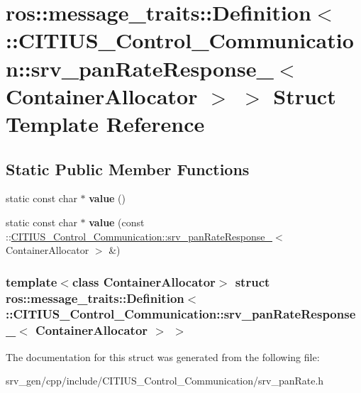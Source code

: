 \hypertarget{structros_1_1message__traits_1_1_definition_3_01_1_1_c_i_t_i_u_s___control___communication_1_1sre52d93f29599aaca44d221f01e8df1fa}{\section{ros\-:\-:message\-\_\-traits\-:\-:\-Definition$<$ \-:\-:\-C\-I\-T\-I\-U\-S\-\_\-\-Control\-\_\-\-Communication\-:\-:srv\-\_\-pan\-Rate\-Response\-\_\-$<$ \-Container\-Allocator $>$ $>$ \-Struct \-Template \-Reference}
\label{structros_1_1message__traits_1_1_definition_3_01_1_1_c_i_t_i_u_s___control___communication_1_1sre52d93f29599aaca44d221f01e8df1fa}
}
\subsection*{\-Static \-Public \-Member \-Functions}
\begin{DoxyCompactItemize}
\item 
\hypertarget{structros_1_1message__traits_1_1_definition_3_01_1_1_c_i_t_i_u_s___control___communication_1_1sre52d93f29599aaca44d221f01e8df1fa_ab8ba76968ed77eec5169feb2a9bb8696}{static const char $\ast$ {\bfseries value} ()}\label{structros_1_1message__traits_1_1_definition_3_01_1_1_c_i_t_i_u_s___control___communication_1_1sre52d93f29599aaca44d221f01e8df1fa_ab8ba76968ed77eec5169feb2a9bb8696}

\item 
\hypertarget{structros_1_1message__traits_1_1_definition_3_01_1_1_c_i_t_i_u_s___control___communication_1_1sre52d93f29599aaca44d221f01e8df1fa_ab608cac180689d3f8d9387c0dd2df056}{static const char $\ast$ {\bfseries value} (const \-::\hyperlink{struct_c_i_t_i_u_s___control___communication_1_1srv__pan_rate_response__}{\-C\-I\-T\-I\-U\-S\-\_\-\-Control\-\_\-\-Communication\-::srv\-\_\-pan\-Rate\-Response\-\_\-}$<$ \-Container\-Allocator $>$ \&)}\label{structros_1_1message__traits_1_1_definition_3_01_1_1_c_i_t_i_u_s___control___communication_1_1sre52d93f29599aaca44d221f01e8df1fa_ab608cac180689d3f8d9387c0dd2df056}

\end{DoxyCompactItemize}
\subsubsection*{template$<$class Container\-Allocator$>$ struct ros\-::message\-\_\-traits\-::\-Definition$<$ \-::\-C\-I\-T\-I\-U\-S\-\_\-\-Control\-\_\-\-Communication\-::srv\-\_\-pan\-Rate\-Response\-\_\-$<$ Container\-Allocator $>$ $>$}



\-The documentation for this struct was generated from the following file\-:\begin{DoxyCompactItemize}
\item 
srv\-\_\-gen/cpp/include/\-C\-I\-T\-I\-U\-S\-\_\-\-Control\-\_\-\-Communication/srv\-\_\-pan\-Rate.\-h\end{DoxyCompactItemize}

